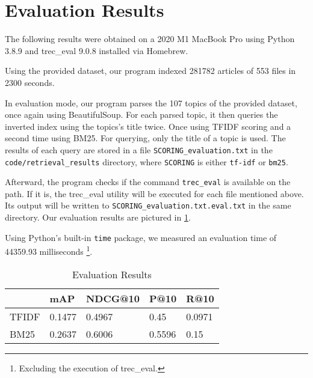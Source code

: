 \section{Evaluation Results}
\label{sec:results}

The following results were obtained on a 2020 M1 MacBook Pro using Python 3.8.9 and trec\_eval 9.0.8 installed via Homebrew.

\medskip

Using the provided dataset, our program indexed 281782 articles of 553 files in 2300 seconds.

\medskip

In evaluation mode, our program parses the 107 topics of the provided dataset, once again using BeautifulSoup.
For each parsed topic, it then queries the inverted index using the topics's title twice.
Once using TFIDF scoring and a second time using BM25.
For querying, only the title of a topic is used.
The results of each query are stored in a file \verb|SCORING_evaluation.txt| in the \verb|code/retrieval_results| directory, where \verb|SCORING| is either \verb|tf-idf| or \verb|bm25|.

Afterward, the program checks if the command \verb|trec_eval| is available on the path.
If it is, the trec\_eval utility will be executed for each file mentioned above.
Its output will be written to \verb|SCORING_evaluation.txt.eval.txt| in the same directory.
Our evaluation results are pictured in \cref{table:results}.

Using Python's built-in \verb|time| package, we measured an evaluation time of 44359.93 milliseconds \footnote{Excluding the execution of trec\_eval.}.

\begin{table}[]
\center
\begin{tabular}{|l|l|l|l|l|}
	\hline
	      & mAP    & NDCG@10 & P@10   & R@10   \\
	\hline
	TFIDF & 0.1477 & 0.4967  & 0.45   & 0.0971 \\
	\hline
	BM25  & 0.2637 & 0.6006  & 0.5596 & 0.15   \\
	\hline
\end{tabular}
\caption{Evaluation Results}
\label{table:results}
\end{table}
